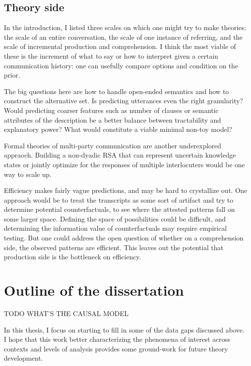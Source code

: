 \documentclass[]{article}
\begin{document}
	\subsection{Theory side}
	
	In the introduction, I listed three scales on which one might try to make theories: the scale of an entire conversation, the scale of one instance of referring, and the scale of incremental production and comprehension. 
	I think the most viable of these is the increment of what to say or how to interpret given a certain communication history: one can usefully compare options and condition on the prior. 
	
	The big questions here are how to handle open-ended semantics and how to construct the alternative set. Is predicting utterances even the right granularity? Would predicting coarser features such as number of clauses or semantic attributes of the description be a better balance between tractability and explanatory power? What would constitute a viable minimal  non-toy model? 
	
	Formal theories of multi-party communication are another underexplored appraoch. Building a non-dyadic RSA that can represent uncertain knowledge states or jointly optimize for the responses of multiple interlocuters would be one way to scale up. 
	
	Efficiency makes fairly vague predictions, and may be hard to crystallize out. One approach would be to treat the transcripts as some sort of artifact and try to determine potential counterfactuals, to see where the attested patterns fall on some larger space. Defining the space of possibilities could be difficult, and determining the information value of counterfactuals may require empirical testing. But one could address the open question of whether on a comprehension side, the observed patterns are efficient. This leaves out the potential that production side is the bottleneck on efficiency.  
	
	
	\section{Outline of the dissertation}
	TODO WHAT'S THE CAUSAL MODEL
	
	In this thesis, I focus on starting to fill in some of the data gaps discussed above. I hope that this work better characterizing the phenomena of interest across contexts and levels of analysis provides some ground-work for future theory development. 
\end{document}
